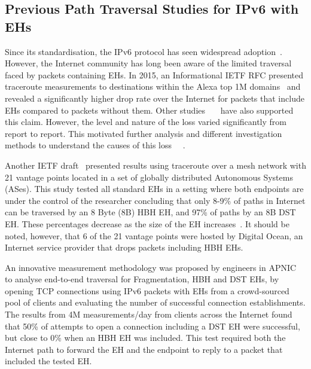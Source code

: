 \documentclass[conference]{IEEEtran}
\begin{document}
\subsection{Previous Path Traversal Studies for IPv6 with EHs}

\label{sec:motivation}

Since its standardisation, the IPv6 protocol has seen
widespread adoption~\cite{v6adoption_ton}. However,
the Internet community has long been aware of the limited traversal faced
by packets containing EHs.  In 2015, an Informational IETF RFC presented
traceroute measurements to destinations within the Alexa top 1M
domains~\cite{RFC7872} and revealed a significantly higher drop rate over the Internet for
packets that include EHs compared to packets without them.
Other studies~\cite{james}~\cite{nalini-iepg114}~\cite{apnic} have also
supported this claim.  However, the level and nature of the loss varied
significantly from report to report. This motivated further analysis and
different investigation methods to understand the causes of this loss
~\cite{james}~\cite{elkins-v6ops-eh-deepdive-fw-01}.  

Another IETF draft~\cite{james} presented results using traceroute over a
mesh network with 21 vantage points located in a set of globally distributed
Autonomous Systems (ASes). This study tested all standard EHs in a setting
where both endpoints are under the control of the researcher concluding that
only 8-9\% of paths in Internet can be traversed by an 8 Byte (8B) HBH EH, and 97\% of paths by an 8B DST EH.  These percentages decrease as the
size of the EH increases~\cite{james-imc}. It should be noted, however, that 6
of the 21 vantage points were hosted by Digital Ocean\texttrademark, an
Internet service provider that drops packets including HBH EHs.

An innovative measurement methodology was proposed by engineers in
APNIC~\cite{apnic} to analyse end-to-end traversal for Fragmentation, HBH and
DST EHs, by opening TCP connections using IPv6 packets
with EHs from a crowd-sourced pool of clients and evaluating the number of
successful connection establishments.  The results from 4M
measurements/day from clients across the Internet found that 50\%  of
attempts to open a connection including a DST EH were successful, but close to 0\%
when an HBH EH was included.  This test
required both the Internet path to forward the EH and the endpoint to reply to
a packet that included the tested EH. 

\end{document}
